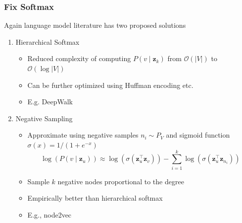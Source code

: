 \documentclass{beamer}
\begin{document}
\begin{frame}
    \frametitle{Fix Softmax}
    Again language model literature has two proposed solutions \cite{mikolov2013distributed}
        \begin{enumerate}
            \item Hierarchical Softmax
            \begin{itemize}
                \item Reduced complexity of computing $P(v \mid \mathbf{z}_{k})$ from $\mathcal{O}(|V|)$ to $\mathcal{O}(\log|V|)$
                \item Can be further optimized using Huffman encoding etc.
                \item E.g. DeepWalk \cite{Perozzi_2014}
            \end{itemize}
            \item Negative Sampling 
            \begin{itemize}
                \item Approximate using negative samples $n_{i} \sim P_{V}$ and sigmoid function $\sigma(x) = 1/(1+e^{-x})$ 
                \[ \log(P(v\mid \mathbf{z}_{u}))\approx\log\left(\sigma\left(\mathbf{z}_{u}^{\top} \mathbf{z}_{v}\right)\right)-\sum_{i=1}^{k} \log \left(\sigma\left(\mathbf{z}_{u}^{\top} \mathbf{z}_{n_{i}}\right)\right)\]
                \item Sample $k$ negative nodes proportional to the degree
                \item Empirically better than hierarchical softmax
                \item E.g., node2vec \cite{Grover_2016}
            \end{itemize}
        \end{enumerate}
\end{frame}
\end{document}
